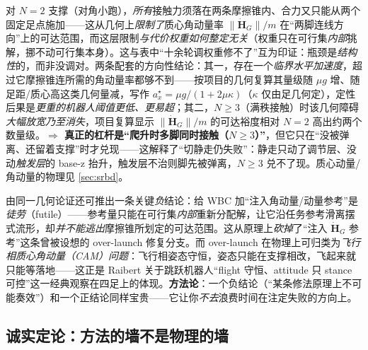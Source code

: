 \begin{insight}\label{ins:ld-angmom-bound}
对 $N=2$ 支撑（对角小跑），\emph{所有}接触力须落在两条摩擦锥内、合力又只能从两个固定足点施加——这从几何上\emph{限制了}质心角动量率 $\|\dot{\boldsymbol H}_G\|/m$ 在“两脚连线方向”上的可达范围，而这层限制\emph{与代价权重如何整定无关}（权重只在可行集\emph{内部}挑解，挪不动可行集本身）。这与表中“十余轮调权重修不了”互为印证：瓶颈是\emph{结构性}的，而非没调对。两条配套的方向性结论：其一，存在一个\emph{临界水平加速度}，超过它摩擦锥连所需的角动量率都够不到——按项目的几何复算其量级随 $\mu g$ 增、随足距/质心高这类几何量减，写作 $a_x^\star=\mu g/(1+2\mu\kappa)$（$\kappa$ 仅由足几何定），定性后果是\emph{更重的机器人阈值更低、更易超}；其二，$N\ge 3$（满秩接触）时该几何障碍\emph{大幅放宽乃至消失}，项目复算显示 $\|\dot{\boldsymbol H}_G\|/m$ 的可达裕度相对 $N=2$ 高出约两个数量级。\textbf{$\Rightarrow$ 真正的杠杆是“爬升时多脚同时接触（$N\ge 3$）”}，但它只在“没被弹离、还留着支撑”时才兑现——这解释了“切静走仍失败”：静走只动了调节层、没动\emph{触发层}的 base-z 抬升，触发层不治则脚先被弹离，$N\ge 3$ 兑不了现。质心动量/角动量的物理见 \cref{sec:srbd}。
\end{insight}

\begin{insight}\label{ins:ld-angmom-futile}
由同一几何论证还可推出一条关键\emph{负}结论：给 WBC 加“注入角动量/动量参考”是\emph{徒劳}（futile）——参考量只能在可行集\emph{内部}重新分配解，让它沿任务参考滑离摆式流形，却\emph{并不能逃出}摩擦锥所划定的可达范围。这从原理上\emph{砍掉}了“注入 $\dot{\boldsymbol H}_G$ 参考”这条曾被设想的 over-launch 修复分支。而 over-launch 在物理上可归类为\emph{飞行相质心角动量（CAM）问题}：飞行相姿态守恒，姿态只能在支撑相改，飞起来就只能等落地——这正是 Raibert 关于跳跃机器人“flight 守恒、attitude 只 stance 可控”这一经典观察在四足上的体现\cite{raibert1986legged}。\textbf{方法论}：一个负结论（“某条修法原理上不可能奏效”）和一个正结论同样宝贵——它让你\emph{不去}浪费时间在注定失败的方向上。
\end{insight}

\subsection{诚实定论：方法的墙不是物理的墙}
\label{subsec:ld-ol-honest}

